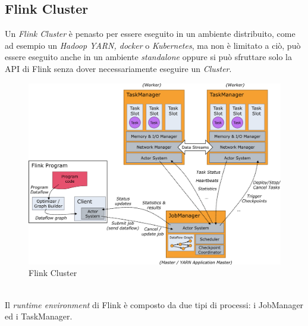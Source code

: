 \subsection{Flink Cluster}
\label{subsec:flink_cluster}
Un \textit{Flink Cluster} è penasto per essere eseguito in un ambiente distribuito, come ad esempio un \textit{Hadoop YARN, docker} o \textit{Kubernetes},
ma non è limitato a ciò, può essere eseguito anche in un ambiente \textit{standalone} oppure si può sfruttare solo la API di Flink senza dover necessariamente eseguire un \textit{Cluster}.
\begin{figure}[htbp]
    \centering
    \includegraphics[width=\textwidth]{images/flink/cluster.jpg}
    \caption{Flink Cluster}
    \label{fig:flink_cluster}
\end{figure}
\\Il \textit{runtime environment} di Flink è composto da due tipi di processi: i JobManager ed i TaskManager.
